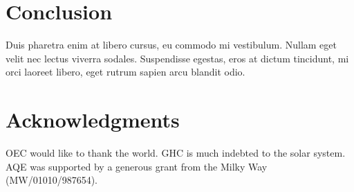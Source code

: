 \documentclass[11pt]{article}
\begin{document}
\section*{Conclusion}

Duis pharetra enim at libero cursus, eu commodo mi vestibulum. Nullam 
eget velit nec lectus viverra sodales. Suspendisse egestas, eros at 
dictum tincidunt, mi orci laoreet libero, eget rutrum sapien arcu 
blandit odio.


\section*{Acknowledgments}

OEC would like to thank the world. GHC is much indebted to 
the solar system. AQE was supported by a generous grant from 
the Milky Way (MW/01010/987654).






\end{document}
